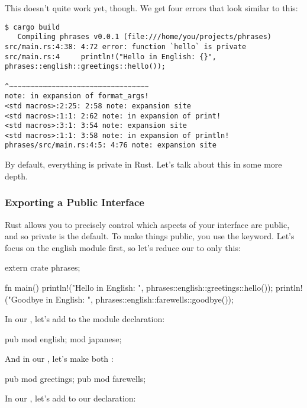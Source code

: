 \blank

This doesn't quite work yet, though. We get four errors that look similar to this:

\begin{verbatim}
$ cargo build
   Compiling phrases v0.0.1 (file:///home/you/projects/phrases)
src/main.rs:4:38: 4:72 error: function `hello` is private
src/main.rs:4     println!("Hello in English: {}", phrases::english::greetings::hello());
                                                   ^~~~~~~~~~~~~~~~~~~~~~~~~~~~~~~~~~
note: in expansion of format_args!
<std macros>:2:25: 2:58 note: expansion site
<std macros>:1:1: 2:62 note: in expansion of print!
<std macros>:3:1: 3:54 note: expansion site
<std macros>:1:1: 3:58 note: in expansion of println!
phrases/src/main.rs:4:5: 4:76 note: expansion site
\end{verbatim}

By default, everything is private in Rust. Let's talk about this in some more depth.

\subsubsection*{Exporting a Public Interface}

Rust allows you to precisely control which aspects of your interface are public, and so private is the default. To make things public, 
you use the  keyword. Let's focus on the english module first, so let's reduce our  to only this:

\begin{rustc}
extern crate phrases;

fn main() {
    println!("Hello in English: {}", phrases::english::greetings::hello());
    println!("Goodbye in English: {}", phrases::english::farewells::goodbye());
}
\end{rustc}

In our , let's add  to the  module declaration:

\begin{rustc}
pub mod english;
mod japanese;
\end{rustc}

And in our , let's make both :

\begin{rustc}
pub mod greetings;
pub mod farewells;
\end{rustc}

In our , let's add  to our  declaration:

